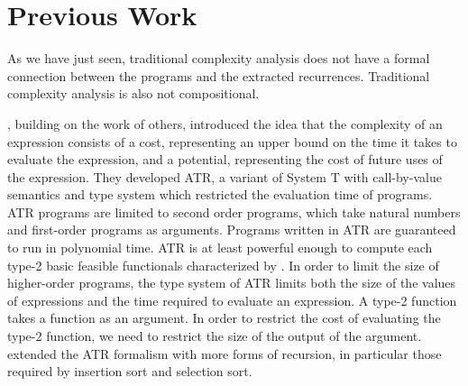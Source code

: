 \section{Previous Work}

As we have just seen, traditional complexity analysis does not have a formal
connection between the programs and the extracted recurrences. Traditional
complexity analysis is also not compositional.



\citet{Danner2007}, building on the work of others, introduced the
idea that the complexity of an expression consists of a cost, representing an
upper bound on the time it takes to evaluate the expression, and a potential,
representing the cost of future uses of the expression. They developed ATR, a
variant of System T with call-by-value semantics and type system which
restricted the evaluation time of programs. ATR programs are limited to second
order programs, which take natural numbers and first-order programs as
arguments. Programs written in ATR are guaranteed to run in polynomial time. ATR
is at least powerful enough to compute each type-2 basic feasible functionals
characterized by \citet{KC96}. In order to limit the size of higher-order
programs, the type system of ATR limits both the size of the values of
expressions and the time required to evaluate an expression. A type-2 function
takes a function as an argument. In order to restrict the cost of evaluating
the type-2 function, we need to restrict the size of the output of the argument.
\citet{Danner2009} extended the ATR formalism with more forms of recursion, in
particular those required by insertion sort and selection sort.




